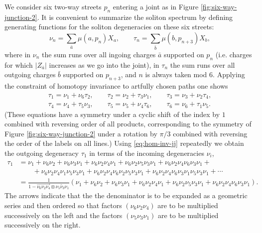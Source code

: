 \documentclass[11pt,a4paper]{article}
\newcommand{\abs}[1]{\lvert#1\rvert}
\begin{document}
We consider six two-way streets $p_n$ entering a joint
as in Figure \ref{fig:six-way-junction-2}.
It is convenient to summarize the soliton spectrum by defining
generating functions for the soliton degeneracies on these six streets:
\begin{equation}
 \nu_n = \sum_{\bar a} \mu(a, p_n) X_{a}, \qquad \tau_n = \sum_{\bar b} \mu(b, p_{n+3}) X_{b},
\end{equation}
where in $\nu_n$ the sum runs over all ingoing charges $\bar{a}$ supported on $p_n$ (i.e.
charges for which $\abs{Z_{\bar a}}$ increases as we go into the joint),
in $\tau_n$ the sum runs over all outgoing charges $\bar{b}$ supported on $p_{n+3}$,
and $n$ is always taken mod $6$.
Applying the constraint of homotopy invariance to artfully chosen paths one shows
\begin{align} \label{eq:hom-inv-jj}
 \tau_1 = \nu_1 + \nu_6 \tau_2, \qquad \tau_2 = \nu_2 + \tau_3 \nu_1, \qquad \tau_3 = \nu_3 + \nu_2 \tau_4, \\ \nonumber
 \tau_4 = \nu_4 + \tau_5 \nu_3, \qquad \tau_5 = \nu_5 + \nu_4 \tau_6, \qquad \tau_6 = \nu_6 + \tau_1 \nu_5.
\end{align}
(These equations have a symmetry under a cyclic shift of the index by $1$ combined with reversing order of
all products, corresponding to the symmetry of Figure \ref{fig:six-way-junction-2} under a rotation by
$\pi/3$ combined with reversing the order of the labels on all lines.)
Using \eqref{eq:hom-inv-jj} repeatedly we obtain the outgoing degeneracy $\tau_1$
in terms of the incoming degeneracies $\nu_i$,
\begin{equation}\label{eq:outgoing-2wayjoint}
\begin{split}
\tau_1
& = \nu_1 + \nu_6 \nu_2 + \nu_6 \nu_3 \nu_1 + \nu_6 \nu_2 \nu_4 \nu_1 + \nu_6\nu_2\nu_5\nu_3\nu_1 + \nu_6\nu_2\nu_4\nu_6\nu_3 \nu_1 + \\
& \qquad + \nu_6 \nu_2\nu_4 \nu_1\nu_5\nu_3\nu_1 + \nu_6\nu_2\nu_4\nu_6 \nu_2\nu_5\nu_3\nu_1 + \nu_6\nu_2\nu_4\nu_6\nu_3\nu_1\nu_5\nu_3\nu_1 + \cdots \\
& = \frac{1}{1 - \overrightarrow{\nu_6\nu_2\nu_4} \otimes \overleftarrow{\nu_5 \nu_3\nu_1}}\left(
 \nu_1 + \nu_6 \nu_2 + \nu_6 \nu_3 \nu_1 + \nu_6 \nu_2 \nu_4 \nu_1 + \nu_6\nu_2\nu_5\nu_3\nu_1 +  \nu_6\nu_2\nu_4\nu_6\nu_3 \nu_1\right).
\end{split}
\end{equation}
The arrows indicate that the the denominator is to be expanded as a
geometric series and then ordered so that factors $(\nu_6\nu_2\nu_4)$ are to be
multiplied successively on the left and the factors $(\nu_5 \nu_3\nu_1)$ are to
be multiplied successively on the right.
\end{document}
